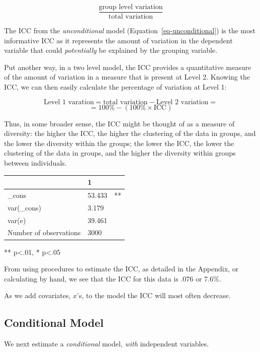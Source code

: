 \documentclass[
  letterpaper,
  DIV=11,
  numbers=noendperiod]{scrreprt}
\begin{document}
\[\frac{\text{group level variation}}{\text{total variation}}\]

The ICC from the \emph{unconditional} model
(Equation~\ref{eq-unconditional}) is the most informative ICC as it
represents the amount of variation in the dependent variable that could
\emph{potentially} be explained by the grouping variable.

Put another way, in a two level model, the ICC provides a quantitative
measure of the amount of variation in a measure that is present at Level
2. Knowing the ICC, we can then easily calculate the percentage of
variation at Level 1:

\[\text{Level 1 varation} = \text{total variation} - \text{Level 2 variation} =\]
\[= 100\% - (100\% \times \text{ICC})\]

Thus, in some broader sense, the ICC might be thought of as a measure of
diversity: the higher the ICC, the higher the clustering of the data in
groups, and the lower the diversity within the groups; the lower the
ICC, the lower the clustering of the data in groups, and the higher the
diversity within groups between individuals.

\begin{longtable}[]{@{}lll@{}}
\toprule\noalign{}
& 1 & \\
\midrule\noalign{}
\endhead
\bottomrule\noalign{}
\endlastfoot
\_cons & 53.433 & ** \\
var(\_cons) & 3.179 & \\
var(e) & 39.461 & \\
Number of observations & 3000 & \\
\end{longtable}

** p\textless.01, * p\textless.05

From using procedures to estimate the ICC, as detailed in the Appendix,
or calculating by hand, we see that the ICC for this data is .076 or
7.6\%.

As we add covariates, \(x\)'s, to the model the ICC will most often
decrease.

\subsection{Conditional Model}\label{conditional-model}

We next estimate a \emph{conditional} model, \emph{with} independent
variables.
\end{document}
